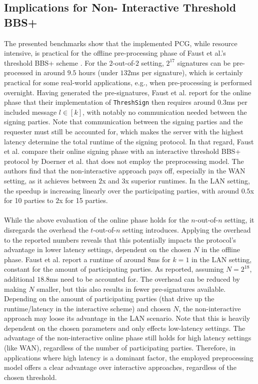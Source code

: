 \subsection{Implications for Non-
\label{subsec:implNIBBs+}
Interactive Threshold BBS+}
The presented benchmarks show that the implemented PCG, while resource intensive, is practical for the offline pre-processing phase of Faust et al.'s threshold BBS+ scheme \cite{faust2023non}. For the $2$-out-of-$2$ setting, $2^{17}$ signatures can be pre-processed in around $9.5$ hours (under $132$ms per signature), which is certainly practical for some real-world applications, e.g., when pre-processing is performed overnight. Having generated the pre-signatures, Faust et al. \cite{faust2023non} report for the online phase that their implementation of \texttt{ThreshSign} then requires around $0.3$ms per included message $l\in[k]$, with notably no communication needed between the signing parties. Note that communication between the signing parties and the requester must still be accounted for, which makes the server with the highest latency determine the total runtime of the signing protocol. In that regard, Faust et al. compare their online signing phase with an interactive threshold BBS+ protocol by Doerner et al. \cite{doerner2023threshold} that does not employ the preprocessing model. The authors find that the non-interactive approach pays off, especially in the WAN setting, as it achieves between $2$x and $3$x superior runtimes. In the LAN setting, the speedup is increasing linearly over the participating parties, with around $0.5$x for 10 parties to $2$x for 15 parties.
\\\\
While the above evaluation of the online phase holds for the $n$-out-of-$n$ setting, it disregards the overhead the $t$-out-of-$n$ setting introduces. Applying the overhead to the reported numbers reveals that this potentially impacts the protocol's advantage in lower latency settings, dependent on the chosen $N$ in the offline phase. Faust et al. report a runtime of around $8$ms for $k=1$ in the LAN setting, constant for the amount of participating parties. As reported, assuming $N=2^{18}$, additional $18.8$ms need to be accounted for. The overhead can be reduced by making $N$ smaller, but this also results in fewer pre-signatures available. Depending on the amount of participating parties (that drive up the runtime/latency in the interactive scheme) and chosen $N$, the non-interactive approach may loose its advantage in the LAN scenario. Note that this is heavily dependent on the chosen parameters and only effects low-latency settings. The advantage of the non-interactive online phase still holds for high latency settings (like WAN), regardless of the number of participating parties. Therefore, in applications where high latency is a dominant factor, the employed preprocessing model offers a clear advantage over interactive approaches, regardless of the chosen threshold.